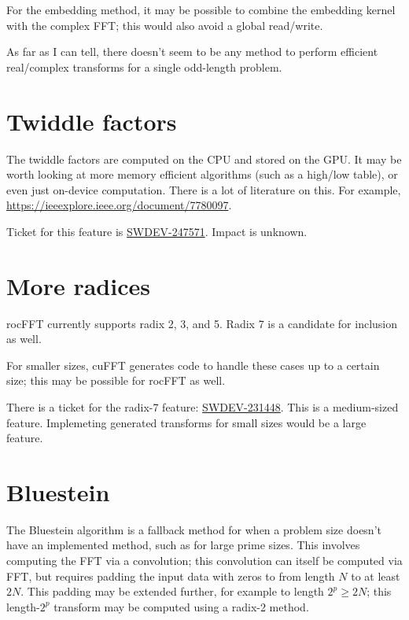 \documentclass[12pt]{article}
\renewcommand{\(}{\left(}
\renewcommand{\)}{\right)}
\begin{document}
For the embedding method, it may be possible to combine the embedding
kernel with the complex FFT; this would also avoid a global read/write.

As far as I can tell, there doesn't seem to be any method to perform
efficient real/complex transforms for a single odd-length problem.

\section{Twiddle factors}

The twiddle factors are computed on the CPU and stored on the GPU.  It
may be worth looking at more memory efficient algorithms (such as a
high/low table), or even just on-device computation.  There is a lot
of literature on this.  For example,
\url{https://ieeexplore.ieee.org/document/7780097}.

Ticket for this feature is \href{http://ontrack-internal.amd.com/browse/SWDEV-247571}
{SWDEV-247571}.  Impact is unknown.

\section{More radices}

rocFFT currently supports radix 2, 3, and 5.  Radix 7 is a candidate
for inclusion as well.

For smaller sizes, cuFFT generates code to handle these cases up to a
certain size; this may be possible for rocFFT as well.

There is a ticket for the radix-7 feature:
\href{http://ontrack-internal.amd.com/browse/SWDEV-231448}{SWDEV-231448}.
This is a medium-sized feature.  Implemeting generated transforms for
small sizes would be a large feature.

\section{Bluestein}

The Bluestein algorithm is a fallback method for when a problem size
doesn't have an implemented method, such as for large prime sizes.
This involves computing the FFT via a convolution; this convolution
can itself be computed via FFT, but requires padding the input data
with zeros to from length $N$ to at least $2N$.  This padding may be
extended further, for example to length $2^p \geq 2N$; this
length-$2^p$ transform may be computed using a radix-2 method.
\end{document}
